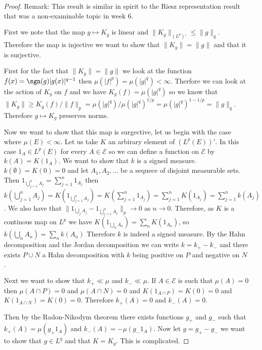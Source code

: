 \documentclass[
]{book}
\theoremstyle{definition}
\theoremstyle{definition}
\theoremstyle{definition}
\theoremstyle{definition}
\theoremstyle{remark}
\begin{document}
\begin{proof}
Remark: This result is similar in spirit to the Riesz representation result that was a non-examinable topic in week 6.

First we note that the map \(g \mapsto K_g\) is linear and \(\|K_g\|_{(L^p)'} \leq \|g\|_q\). Therefore the map is injective we want to show that \(\|K_g\| = \|g\|\) and that it is surjective.

First for the fact that \(\|K_g\| = \|g\|\) we look at the function \(f(x) = \sgn(g)|g(x)|^{q-1}\) then \(\mu(|f|^p) = \mu(|g|^q) < \infty\). Therfore we can look at the action of \(K_g\) on \(f\) and we have \(K_g(f) = \mu(|g|^q)\) so we know that \(\|K_g\| \geq K_g(f)/\|f\|_p = \mu(|g|^q)/\mu(|g|^q)^{1/p} = \mu(|g|^q)^{1-1/p} = \|g\|_q\). Therefore \(g \mapsto K_g\) preserves norms.

Now we want to show that this map is surgective, let us begin with the case where \(\mu(E)<\infty\). Let us take \(K\) an arbirary element of \((L^p(E))'\). In this case \(1_A \in L^p(E)\) for every \(A \in \mathcal{E}\) so we can define a function on \(\mathcal{E}\) by \(k(A)=K(1_A)\). We want to show that \(k\) is a signed measure. \(k(\emptyset)=K(0)=0\) and let \(A_1,A_2,\dots\) be a sequece of disjoint measurable sets. Then \(1_{\bigcup_{j=1}^n A_j} = \sum_{j=1}^n 1_{A_j}\) then \(k(\bigcup_{j=1}^n A_j) = K(1_{\bigcup_{j=1}^n A_j}) = K( \sum_{j=1}^n 1_{A_j}) = \sum_{j=1}^n K(1_{A_j}) = \sum_{j=1}^n k(A_j)\). We also have that \(\| 1_{\bigcup_j A_j} - 1_{\bigcup_{j=1}^n A_j} \|_p \rightarrow 0\) as \(n \rightarrow 0\). Therefore, as \(K\) is a continous map on \(L^p\) we have \(K(1_{\bigcup_n A_n}) = \sum_n K(1_{A_n})\), so \(k(\bigcup_n A_n) = \sum_n k(A_n)\) Therefore \(k\) is indeed a signed measure. By the Hahn decomposition and the Jordan decomposition we can write \(k = k_+ - k_-\) and there exists \(P \cup N\) a Hahn decomposition with \(k\) being positive on \(P\) and negative on \(N\).

Next we want to show that \(k_+ \ll \mu\) and \(k_- \ll \mu\). If \(A \in \mathcal{E}\) is such that \(\mu(A) = 0\) then \(\mu(A \cap P)=0\) and \(\mu(A \cap N) = 0\) and \(K(1_{A \cap P}) = K(0) = 0\) and \(K(1_{A \cap N}) = K(0) = 0\). Therefore \(k_+(A) = 0\) and \(k_-(A) = 0\).

Then by the Radon-Nikodym theorem there exists functions \(g_+\) and \(g_-\) such that \(k_+(A) = \mu(g_+1_A)\) and \(k_-(A) = - \mu(g_- 1_A)\). Now let \(g = g_+ - g_-\) we want to show that \(g \in L^q\) and that \(K = K_g\). This is complicated.


\end{proof}
\end{document}

